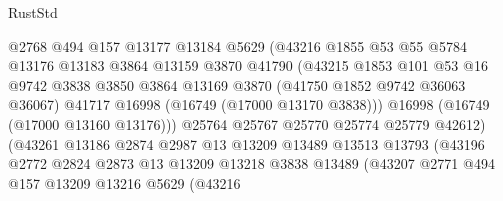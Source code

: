 \begin{lexlean}{RustStd}
\begin{coremodule}
                              @2768
                              @494
                              @157
                              @13177
                              @13184
                              @5629
                              (@43216
                                @1855
                                @53
                                @55
                                @5784
                                @13176
                                @13183
                                @3864
                                @13159
                                @3870
                                @41790
                                (@43215
                                  @1853
                                  @101
                                  @53
                                  @16
                                  @9742
                                  @3838
                                  @3850
                                  @3864
                                  @13169
                                  @3870
                                  (@41750 @1852 @9742 @36063 @36067)
                                  @41717
                                  @16998
                                  (@16749 (@17000 @13170 @3838)))
                                @16998
                                (@16749 (@17000 @13160 @13176)))
                              @25764
                              @25767
                              @25770
                              @25774
                              @25779
                              @42612)
                            (@43261
                              @13186
                              @2874
                              @2987
                              @13
                              @13209
                              @13489
                              @13513
                              @13793
                              (@43196
                                @2772
                                @2824
                                @2873
                                @13
                                @13209
                                @13218
                                @3838
                                @13489
                                (@43207
                                  @2771
                                  @494
                                  @157
                                  @13209
                                  @13216
                                  @5629
                                  (@43216

\end{coremodule}
\end{lexlean}
